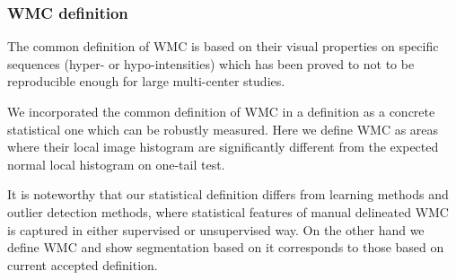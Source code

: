 \subsubsection{WMC definition}
The common definition of WMC is based on their visual properties on specific sequences (hyper- or hypo-intensities) which has been proved to not to be reproducible enough for large multi-center studies. 
\par
We incorporated the common definition of WMC in a definition as a concrete statistical one which can be robustly measured. Here we  define WMC as areas where their local image histogram are significantly different from the expected normal local histogram on one-tail test.
\par
It is noteworthy that our statistical definition differs from learning methods and outlier detection methods, where statistical features of manual delineated WMC is captured in either supervised or unsupervised way. On the other hand we define WMC and show segmentation based on it corresponds to those based on current accepted definition. 

    
    
    
    